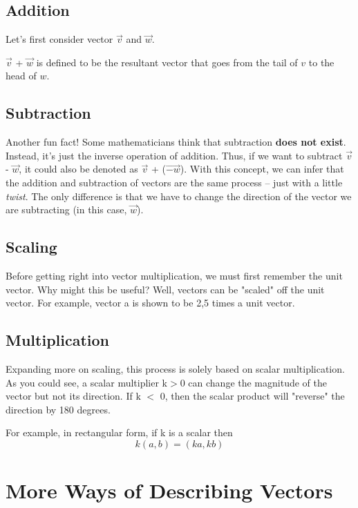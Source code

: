 \subsection{Addition}
Let's first consider vector $\overrightarrow{v}$ and  $\overrightarrow{w}$.

$\overrightarrow{v}$ + $\overrightarrow{w}$ is defined to be the resultant vector that goes from the tail of $v$ to the head of $w$. 
\subsection{Subtraction}
Another fun fact! Some mathematicians think that subtraction \textbf{does not exist}. Instead, it's just the inverse operation of addition. Thus, if we want to subtract $\overrightarrow{v}$ - $\overrightarrow{w}$, it could also be denoted as $\overrightarrow{v}$ + ($\overrightarrow{-w}$). With this concept, we can infer that the addition and subtraction of vectors are the same process -- just with a little \textit{twist}. The only difference is that we have to change the direction of the vector we are subtracting (in this case, $\overrightarrow{w}$). 

\subsection{Scaling}
Before getting right into vector multiplication, we must first remember the unit vector. Why might this be useful? Well, vectors can be "scaled" off the unit vector. For example, vector a is shown to be 2,5 times a unit vector. 

\subsection{Multiplication}
Expanding more on scaling, this process is solely based on scalar multiplication. As you could see, a scalar multiplier k$>$0 can change the magnitude of the vector but not its direction. If k $<$ 0, then the scalar product will "reverse" the direction by 180 degrees.

For example, in rectangular form, if k is a scalar then
\[k(a,b) = (ka, kb)\]

\section{More Ways of Describing Vectors}
